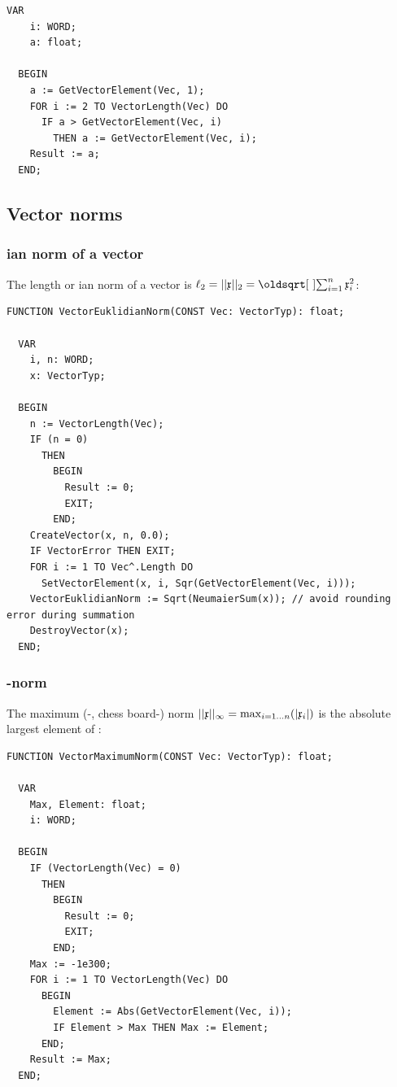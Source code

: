 \begin{refsection}
\begin{lstlisting}[caption=Smallest and largest absolute value]
  VAR
    i: WORD;
    a: float;

  BEGIN
    a := GetVectorElement(Vec, 1);
    FOR i := 2 TO VectorLength(Vec) DO
      IF a > GetVectorElement(Vec, i)
        THEN a := GetVectorElement(Vec, i);
    Result := a;
  END;
\end{lstlisting}

\subsection{Vector norms}\label{text:Norm}


\subsubsection{ian norm of a vector}

The length or ian norm of a vector is \(\ell_2 = ||\AbsVec{x}||_2 = \sqrt{\sum_{i=1}^n{\AbsVec{x}_i^2}} \):

\begin{lstlisting}[caption=\Name{Euklid}ian norm]
  FUNCTION VectorEuklidianNorm(CONST Vec: VectorTyp): float;

  VAR
    i, n: WORD;
    x: VectorTyp;

  BEGIN
    n := VectorLength(Vec);
    IF (n = 0)
      THEN
        BEGIN
          Result := 0;
          EXIT;
        END;
    CreateVector(x, n, 0.0);
    IF VectorError THEN EXIT;
    FOR i := 1 TO Vec^.Length DO
      SetVectorElement(x, i, Sqr(GetVectorElement(Vec, i)));
    VectorEuklidianNorm := Sqrt(NeumaierSum(x)); // avoid rounding error during summation
    DestroyVector(x);
  END;
\end{lstlisting}

\subsubsection{-norm}

The maximum (-, chess board-) norm \(||\mathfrak{x}||_\infty = \max_{i=1\ldots n}(|\mathfrak{x}_i|) \) is the absolute largest element of :

\begin{lstlisting}[caption=Maximum norm]
  FUNCTION VectorMaximumNorm(CONST Vec: VectorTyp): float;

  VAR
    Max, Element: float;
    i: WORD;

  BEGIN
    IF (VectorLength(Vec) = 0)
      THEN
        BEGIN
          Result := 0;
          EXIT;
        END;
    Max := -1e300;
    FOR i := 1 TO VectorLength(Vec) DO
      BEGIN
        Element := Abs(GetVectorElement(Vec, i));
        IF Element > Max THEN Max := Element;
      END;
    Result := Max;
  END;
\end{lstlisting}


\end{refsection}
